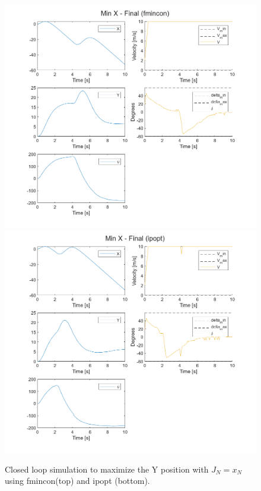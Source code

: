 \documentclass[]{IEEEtran}
\begin{document}
\begin{figure}[h]
    \centering
    \includegraphics[width = \columnwidth]{figs/Min_X_-_Final_(fmincon)_traj.png}
    \includegraphics[width = \columnwidth]{figs/Min_X_-_Final_(ipopt)_traj.png}
    \caption{Closed loop simulation to maximize the Y position with $J_N = x_N$ using fmincon(top) and ipopt (bottom).}\label{fig:minX_final_both}
\end{figure}
\end{document}
